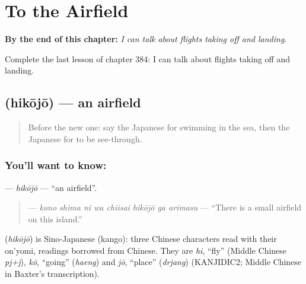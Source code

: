 
\chapter{To the Airfield}
\label{ch:ja-to-the-airfield}

\begin{chapteropening}
\textbf{By the end of this chapter:} \emph{I can talk about flights taking off and landing.}

Complete the last lesson of chapter 384: I can talk about flights taking off and landing.
\end{chapteropening}

\section[\texorpdfstring{\ja{ひこうじょう} (hikōjō)}{ひこうじょう (hikōjō)}]{ (hikōjō) — an airfield}

\label{lesson:JA-C384-hikoujou}



\begin{quote}
Before the new one: say the Japanese for swimming in the sea, then the Japanese for to be see-through.
\end{quote}

\subsection*{You'll want to know: }
\textbf{} — \emph{hikōjō} — \textquotedblleft{}an airfield\textquotedblright{}.

\begin{quote}
\textbf{    } — \emph{kono shima ni wa chiisai hikōjō ga arimasu} — \textquotedblleft{}There is a small airfield on this island.\textquotedblright{}
\end{quote}

\begin{cousinweb}
\textbf{} (\emph{hikōjō}) is Sino-Japanese (kango): three Chinese characters read with their on'yomi, readings borrowed from Chinese. They are \emph{hi}, \textquotedblleft{}fly\textquotedblright{} (Middle Chinese \emph{pj+j}), \emph{kō}, \textquotedblleft{}going\textquotedblright{} (\emph{haeng}) and \emph{jō}, \textquotedblleft{}place\textquotedblright{} (\emph{drjang}) (KANJIDIC2; Middle Chinese in Baxter's transcription).
\end{cousinweb}

